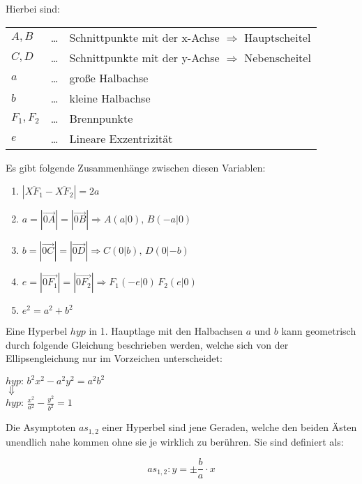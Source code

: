 Hierbei sind:

\begin{tabular}{l c l}
	$A, B$ & \ldots & Schnittpunkte mit der x-Achse $\Rightarrow$ Hauptscheitel\\
	$C, D$ & \ldots &  Schnittpunkte mit der y-Achse $\Rightarrow$ Nebenscheitel\\ 
	$a$ & \ldots & gro\ss{}e Halbachse\\
	$b$ & \ldots & kleine Halbachse \\ 
	$F_{1}, F_{2}$ & \ldots & Brennpunkte\\
	$e$ & \ldots & Lineare Exzentrizit\"{a}t\\
\end{tabular}

Es gibt folgende Zusammenh\"{a}nge zwischen diesen Variablen:

\begin{enumerate}
	\item $|\overbar{XF_{1}} - \overbar{XF_{2}}| = 2a$
	\item $a = |\vec{0A}| = |\vec{0B}| \Rightarrow A (a | 0),\, B (-a | 0)$
	\item $b = |\vec{0C}| = |\vec{0D}| \Rightarrow C (0 | b),\, D (0 | -b)$
	\item $e = |\vec{0F_{1}}| = |\vec{0F_{2}}| \Rightarrow F_{1} (-e | 0)\, F_{2} (e | 0)$
	\item $e^2 = a^2 + b^2$
\end{enumerate}

Eine Hyperbel $hyp$ in 1. Hauptlage mit den Halbachsen $a$ und $b$ kann geometrisch durch folgende Gleichung beschrieben werden, welche sich von der Ellipsengleichung nur im Vorzeichen unterscheidet:

\begin{table}[h!]
	\begin{center}
		$hyp:\, b^2x^2 - a^2y^2 = a^2b^2$\\
		$\Downarrow$\\
		$hyp:\, \frac{x^2}{a^2} - \frac{y^2}{b^2} = 1$
	\end{center}
\end{table}

Die Asymptoten $as_{1, 2}$ einer Hyperbel sind jene Geraden, welche den beiden \"{A}sten unendlich nahe kommen ohne sie je wirklich zu ber\"{u}hren. Sie sind definiert als:

$$as_{1, 2}: y = \pm \frac{b}{a}\cdot{}x$$

